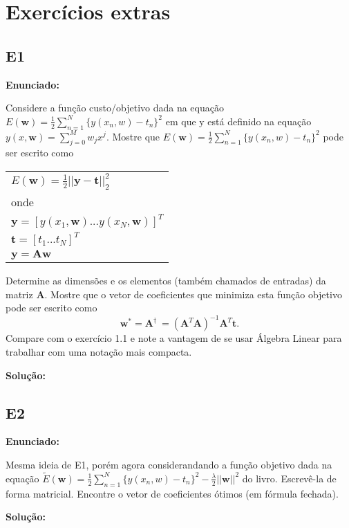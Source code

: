\section{Exercícios extras}

\subsection{E1}
\textbf{Enunciado:} \par
Considere a função custo/objetivo dada na equação $E(\textbf{w})=\frac{1}{2}\sum_{n=1}^{N} \{y(x_n,w)-t_n\}^2$ em que y está definido na equação $y(x,\boldsymbol{w}) = \sum_{j=0}^{M} w_jx^j$. Mostre que $E(\textbf{w})=\frac{1}{2}\sum_{n=1}^{N} \{y(x_n,w)-t_n\}^2$ pode ser escrito como
\begin{center}
    \begin{tabular}{l}
        $E(\boldsymbol{w}) = \frac{1}{2}||\boldsymbol{y}-\boldsymbol{t}||^2_2$  \\
        onde \\
        $\boldsymbol{y} = [y(x_1,\boldsymbol{w})...y(x_N,\boldsymbol{w})]^T$\\
        $\boldsymbol{t}=[t_1...t_N]^T$\\
        $\boldsymbol{y} = \boldsymbol{A} \boldsymbol{w}$
    \end{tabular}       
\end{center}
Determine as dimensões e os elementos (também chamados de entradas) da matriz $\boldsymbol{A}$. Mostre que o vetor de coeficientes que minimiza esta função objetivo pode ser escrito como
\begin{equation*}
    \boldsymbol{w}^{*} = \boldsymbol{A}^\dagger\ = (\boldsymbol{A}^T\boldsymbol{A})^{-1}\boldsymbol{A}^T\boldsymbol{t}.
\end{equation*}
Compare com o exercício 1.1 e note a vantagem de se usar Álgebra Linear para trabalhar com uma notação mais compacta.
\newline \par
\textbf{Solução:}

\subsection{E2}
\textbf{Enunciado:} \par
Mesma ideia de E1, porém agora considerandando a função objetivo dada na equação $\tilde{E}(\textbf{w})=\frac{1}{2}\sum_{n=1}^{N} \{y(x_n,w)-t_n\}^2-\frac{\lambda}{2}||\boldsymbol{w}||^2$ do livro. Escrevê-la de forma matricial. Encontre o vetor de coeficientes ótimos (em fórmula fechada).
\newline \par
\textbf{Solução:}

